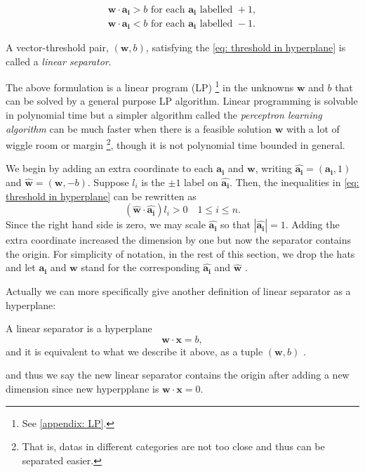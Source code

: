 \begin{equation} \label{eq: threshold in hyperplane}
    \begin{aligned} 
    \mathbf{w} \cdot \mathbf{a_i} > b \text{ for each } \mathbf{a_i} \text{ labelled } +1, \\
    \mathbf{w} \cdot \mathbf{a_i} < b \text{ for each } \mathbf{a_i} \text{ labelled } -1. 
\end{aligned}
\end{equation}
    
\begin{definition}\label{dfn: linear separator}
    A vector-threshold pair, \((\mathbf{w} , b)\), satisfying the \autoref{eq: threshold in hyperplane} is called a \textit{linear separator}. 
\end{definition}

The above formulation is a linear program (LP) \footnote{See \autoref{appendix: LP}.} in the unknowns \(\mathbf{w} \) and \(b\) that can be solved by a general purpose LP algorithm. Linear programming is solvable in polynomial time but a simpler algorithm called the \textit{perceptron learning algorithm} can be much faster when there is a feasible solution \(\mathbf{w} \) with a lot of wiggle room or margin \footnote{That is, datas in different categories are not too close and thus can be separated easier.}, though it is not polynomial time bounded in general.   

We begin by adding an extra coordinate to each \(\mathbf{a_i} \) and \(\mathbf{w} \), writing \(\hat{\mathbf{a_i}} = (\mathbf{a_i}, 1 ) \) and \(\hat{\mathbf{w} } = (\mathbf{w} , -b)\). Suppose \(l_i\) is the \(\pm 1\) label on \(\hat{\mathbf{a_i} } \). Then, the inequalities in \autoref{eq: threshold in hyperplane} can be rewritten as 
\[
    \left( \hat{\mathbf{w} } \cdot \hat{\mathbf{a_i} }  \right) l_i > 0 \quad 1 \le i \le n .
\] Since the right hand side is zero, we may scale \(\hat{\mathbf{a_i} } \) so that \(\left\vert \hat{\mathbf{a_i} }  \right\vert = 1\). Adding the extra coordinate increased the dimension by one but now the separator contains the origin. For simplicity of notation, in the rest of this section, we drop the hats and let \(\mathbf{a_i} \) and \(\mathbf{w} \) stand for the corresponding \(\hat{\mathbf{a_i} } \) and \(\hat{\mathbf{w} } \) .

\begin{note}
    Actually we can more specifically give another definition of linear separator as a hyperplane: 
    \begin{definition}
        A linear separator is a hyperplane 
        \[
            \mathbf{w} \cdot \mathbf{x} = b,
        \]
        and it is equivalent to what we describe it above, as a tuple \((\mathbf{w} , b)\) .
    \end{definition}

    and thus we say the new linear separator contains the origin after adding a new dimension since new hyperpplane is 
    \(\mathbf{w} \cdot \mathbf{x} = 0\). 
\end{note}

